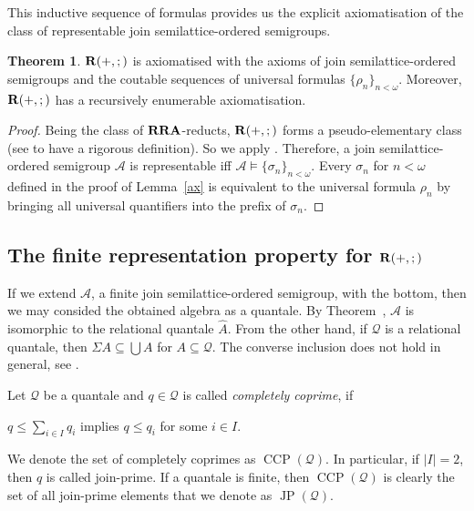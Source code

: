 \documentclass[a4paper]{article}
\theoremstyle{definition}
\theoremstyle{theorem}
\newtheorem{theorem}{Theorem}
\theoremstyle{proposition}
\theoremstyle{lemma}
\theoremstyle{ex}
\theoremstyle{corollary}
\theoremstyle{claim}
\begin{document}
This inductive sequence of formulas provides us the explicit axiomatisation of the class of representable join semilattice-ordered semigroups.

\begin{theorem}
  ${\bf R}(+, ;)$ is axiomatised with the axioms of join semilattice-ordered semigroups and the coutable sequences of universal formulas $\{ \rho_n \}_{n < \omega}$. Moreover, ${\bf R}(+, ;)$ has a recursively enumerable axiomatisation.
\end{theorem}

\begin{proof}
  Being the class of ${\bf RRA}$-reducts, ${\bf R}(+, ;)$ forms a pseudo-elementary class (see \cite{eklof1977ultraproducts} to have a rigorous definition). So we apply \cite[Theorem 9.28]{hirsch2002relation}. Therefore, a join semilattice-ordered semigroup $\mathcal{A}$ is representable iff $\mathcal{A} \models \{ \sigma_n \}_{n < \omega}$.
  Every $\sigma_n$ for $n < \omega$ defined in the proof of Lemma~\ref{ax} is equivalent to the universal formula $\rho_n$ by bringing all universal quantifiers into the prefix of $\sigma_n$.
\end{proof}

\subsection{The finite representation property for ${\bf R}(+, ;)$}

If we extend $\mathcal{A}$, a finite join semilattice-ordered semigroup, with the bottom, then we may consided the obtained algebra as a quantale. By Theorem~\label{quantaleRep}, $\mathcal{A}$ is isomorphic to the relational quantale $\widehat{A}$. From the other hand, if $\mathcal{Q}$ is a relational quantale, then $\Sigma A \subseteq \bigcup A$ for $A \subseteq \mathcal{Q}$. The converse inclusion does not hold in general, see \cite[Remark 3.2 and Example 3.6]{brown1993representation}.

Let $\mathcal{Q}$ be a quantale and $q \in \mathcal{Q}$ is called \emph{completely coprime}, if
\begin{center}
  $q \leq \sum \limits_{i \in I} q_i$ implies $q \leq q_i$ for some $i \in I$.
\end{center}
We denote the set of completely coprimes as $\operatorname{CCP}(\mathcal{Q})$.
In particular, if $|I| = 2$, then $q$ is called join-prime. If a quantale is finite, then $\operatorname{CCP}(\mathcal{Q})$ is clearly the set of all join-prime elements that we denote as $\operatorname{JP}(\mathcal{Q})$.
\end{document}
